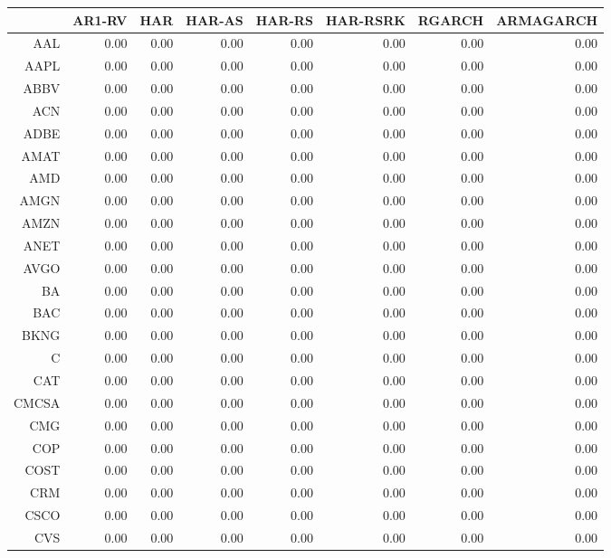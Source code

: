 \begin{table}[ht]
\centering
\begin{tabular}{rrrrrrrr}
  \hline
 & AR1-RV & HAR & HAR-AS & HAR-RS & HAR-RSRK & RGARCH & ARMAGARCH \\ 
  \hline
AAL & 0.00 & 0.00 & 0.00 & 0.00 & 0.00 & 0.00 & 0.00 \\ 
  AAPL & 0.00 & 0.00 & 0.00 & 0.00 & 0.00 & 0.00 & 0.00 \\ 
  ABBV & 0.00 & 0.00 & 0.00 & 0.00 & 0.00 & 0.00 & 0.00 \\ 
  ACN & 0.00 & 0.00 & 0.00 & 0.00 & 0.00 & 0.00 & 0.00 \\ 
  ADBE & 0.00 & 0.00 & 0.00 & 0.00 & 0.00 & 0.00 & 0.00 \\ 
  AMAT & 0.00 & 0.00 & 0.00 & 0.00 & 0.00 & 0.00 & 0.00 \\ 
  AMD & 0.00 & 0.00 & 0.00 & 0.00 & 0.00 & 0.00 & 0.00 \\ 
  AMGN & 0.00 & 0.00 & 0.00 & 0.00 & 0.00 & 0.00 & 0.00 \\ 
  AMZN & 0.00 & 0.00 & 0.00 & 0.00 & 0.00 & 0.00 & 0.00 \\ 
  ANET & 0.00 & 0.00 & 0.00 & 0.00 & 0.00 & 0.00 & 0.00 \\ 
  AVGO & 0.00 & 0.00 & 0.00 & 0.00 & 0.00 & 0.00 & 0.00 \\ 
  BA & 0.00 & 0.00 & 0.00 & 0.00 & 0.00 & 0.00 & 0.00 \\ 
  BAC & 0.00 & 0.00 & 0.00 & 0.00 & 0.00 & 0.00 & 0.00 \\ 
  BKNG & 0.00 & 0.00 & 0.00 & 0.00 & 0.00 & 0.00 & 0.00 \\ 
  C & 0.00 & 0.00 & 0.00 & 0.00 & 0.00 & 0.00 & 0.00 \\ 
  CAT & 0.00 & 0.00 & 0.00 & 0.00 & 0.00 & 0.00 & 0.00 \\ 
  CMCSA & 0.00 & 0.00 & 0.00 & 0.00 & 0.00 & 0.00 & 0.00 \\ 
  CMG & 0.00 & 0.00 & 0.00 & 0.00 & 0.00 & 0.00 & 0.00 \\ 
  COP & 0.00 & 0.00 & 0.00 & 0.00 & 0.00 & 0.00 & 0.00 \\ 
  COST & 0.00 & 0.00 & 0.00 & 0.00 & 0.00 & 0.00 & 0.00 \\ 
  CRM & 0.00 & 0.00 & 0.00 & 0.00 & 0.00 & 0.00 & 0.00 \\ 
  CSCO & 0.00 & 0.00 & 0.00 & 0.00 & 0.00 & 0.00 & 0.00 \\ 
  CVS & 0.00 & 0.00 & 0.00 & 0.00 & 0.00 & 0.00 & 0.00 \\ 

\end{tabular}
\end{table}

